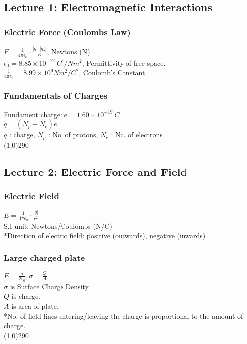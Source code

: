 \documentclass[10 pt]{article}
\begin{document}
\begin{multicols}{2}
\subsection*{Lecture 1: Electromagnetic Interactions}
\subsubsection*{Electric Force (Coulombs Law)}
$F = \frac{1}{4 \pi \epsilon_{0}} \cdot \frac{|q_{1}||q_{2}|}{r^{2}}$, Newtons (N) \\
$\epsilon_{0} = 8.85 \times 10^{-12}~C^{2}/Nm^{2}$, Permittivity of free space.\\
$\frac{1}{4 \pi \epsilon_0} = 8.99 \times 10^9 Nm^2/C^2$, Coulomb's Constant
\subsubsection*{Fundamentals of Charges}
Fundament charge: $e = 1.60 \times 10^{-19}~C$ \\
$q = (N_{p} - N_{e})e$ \\ 
$q$ : charge, $N_{p}$ : No. of protons, $N_{e}$ : No. of electrons
\\
\line(1,0){290}
\subsection*{Lecture 2: Electric Force and Field}
\subsubsection*{Electric Field}
$E = \frac{1}{4 \pi \epsilon_{0}} \cdot \frac{|q|}{r^{2}}$ \\ 
S.I unit: Newtons/Coulombs (N/C) \\
*Direction of electric field: positive (outwards), negative (inwards)

\subsubsection*{Large charged plate}
$E = \frac{\sigma}{2\epsilon_{0}}, \sigma = \frac{Q}{A}.~$\\
$\sigma$ is Surface Charge Density \\
$Q$ is charge. \\
$A$ is area of plate. \\
*No. of field lines entering/leaving the charge is proportional to the amount of charge.
\\
\line(1,0){290}

\end{multicols}
\end{document}
